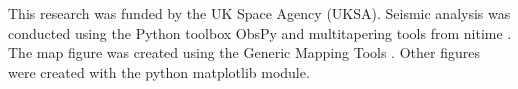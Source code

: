 \begin{acknowledgements}
  This research was funded by the UK Space Agency (UKSA). 
  Seismic analysis was conducted using the Python toolbox ObsPy \citep{Beyreuther2010} and multitapering tools from nitime \citep{Rokem2009}.
  The map figure was created using the Generic Mapping Tools \citep{Wessel2013}. Other figures were created with the python matplotlib module.
\end{acknowledgements}









\grid
